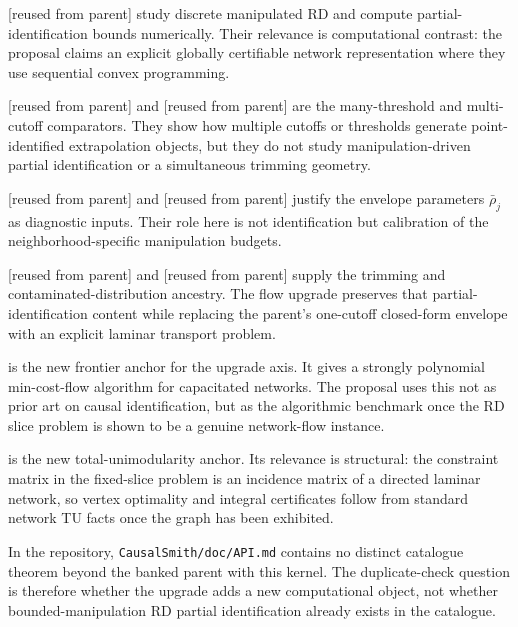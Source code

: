 \documentclass[11pt]{article}
\theoremstyle{definition}
\theoremstyle{plain}
\theoremstyle{remark}
\begin{document}
\citet{rosenman_rajkumar_gauriot_slonim_2019_discrete_manipulation} [reused from parent]
study discrete manipulated RD and compute partial-identification bounds numerically. Their
relevance is computational contrast: the proposal claims an explicit globally certifiable
network representation where they use sequential convex programming.

\citet{bertanha_2020_many_thresholds} [reused from parent] and
\citet{cattaneo_keele_titiunik_vazquezbare_2021_multicutoff} [reused from parent] are the
many-threshold and multi-cutoff comparators. They show how multiple cutoffs or thresholds
generate point-identified extrapolation objects, but they do not study manipulation-driven
partial identification or a simultaneous trimming geometry.

\citet{mccrary_2008_density_test} [reused from parent] and
\citet{cattaneo_jansson_ma_2020_density} [reused from parent] justify the envelope
parameters \(\bar\rho_j\) as diagnostic inputs. Their role here is not identification but
calibration of the neighborhood-specific manipulation budgets.

\citet{lee_2009_selection_bounds} [reused from parent] and
\citet{horowitz_manski_1995_contaminated} [reused from parent] supply the trimming and
contaminated-distribution ancestry. The flow upgrade preserves that partial-identification
content while replacing the parent's one-cutoff closed-form envelope with an explicit
laminar transport problem.

\citet{orlin_1993_mincostflow} is the new frontier anchor for the upgrade axis. It gives a
strongly polynomial min-cost-flow algorithm for capacitated networks. The proposal uses
this not as prior art on causal identification, but as the algorithmic benchmark once the
RD slice problem is shown to be a genuine network-flow instance.

\citet{schrijver_1986_theory_linear_integer} is the new total-unimodularity anchor. Its
relevance is structural: the constraint matrix in the fixed-slice problem is an incidence
matrix of a directed laminar network, so vertex optimality and integral certificates follow
from standard network TU facts once the graph has been exhibited.

In the repository, \texttt{CausalSmith/doc/API.md} contains no distinct catalogue theorem
beyond the banked parent with this kernel. The duplicate-check question is therefore
whether the upgrade adds a new computational object, not whether bounded-manipulation RD
partial identification already exists in the catalogue.
\end{document}
